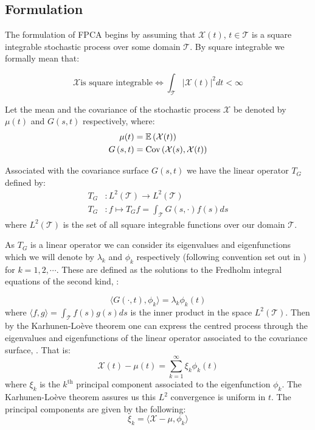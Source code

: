 \subsection{Formulation}
The formulation of FPCA begins by assuming that $\mathcal{X}(t)$, $t \in \mathcal{T}$ is a square integrable stochastic process over some domain $\mathcal{T}$.
By square integrable we formally mean that:

\begin{equation}
	\mathcal{X} \text{is square integrable} \iff \int_{\mathcal{T}} \lvert \mathcal{X}(t) \rvert^2 dt < \infty
\end{equation}

Let the mean and the covariance of the stochastic process $\mathcal{X}$ be denoted by $\mu(t)$ and $G\left(s, t\right)$ respectively, where:
\begin{align}
	\mu(t) &= \operatorname{\mathbb{E}} \left(\mathcal{X}(t)\right) \label{eqn:mean_fn}\\
	G\left(s, t\right) &= \text{Cov}\left(\mathcal{X}(s),  \mathcal{X}(t)\right) \label{eqn:cov_fn}
\end{align}

Associated with the covariance surface $G\left(s, t\right)$ we have the linear operator $T_G$ defined by:
\begin{align}
	T_G &: L^2\left(\mathcal{T}\right) \to L^2\left(\mathcal{T}\right) \\
	T_G&:  f \mapsto T_G f = \int_{\mathcal{T}} G\left(s, \cdot \right) f(s) ds \label{eqn:t_op}
\end{align}
where $ L^2\left(\mathcal{T}\right)$ is the set of all square integrable functions over our domain $\mathcal{T}$. 

As $T_G$ is a linear operator we can consider its eigenvalues and eigenfunctions which we will denote by $\lambda_k$ and $\phi_k$ respectively (following convention set out in \citep{yao_functional_2005}) for $k=1,2,\cdots$.
These are defined as the solutions to the Fredholm integral equations of the second kind, \citep{yao_functional_2005}: 

\begin{equation}\label{eqn:fredholm}
	\langle G(\cdot, t), \phi_k \rangle = \lambda_k \phi_k(t)
\end{equation}
where $\langle f, g \rangle = \int_{\mathcal{T}} f(s) g(s) ds$ is the inner product in the space $L^2(\mathcal{T})$. 
Then by the Karhunen-Lo\`{e}ve theorem one can express the centred process through the eigenvalues and eigenfunctions of the linear operator associated to the covariance surface, \citep{karhunen_zur_1946, loeve_fonctions_1946}.
That is:
\begin{equation}\label{eqn:fpca}
	\mathcal{X}(t) - \mu(t) = \sum_{k=1}^{\infty}\xi_k \phi_k(t)
\end{equation}
where $\xi_k$ is the $k^\text{th}$ principal component associated to the eigenfunction $\phi_k$.
The Karhunen-Lo\`{e}ve theorem assures us this $L^2$ convergence is uniform in $t$.
The principal components are given by the following: 
\begin{equation}\label{eqn:principal_comp}
	\xi_k= \langle \mathcal{X} - \mu, \phi_k \rangle 
\end{equation}

